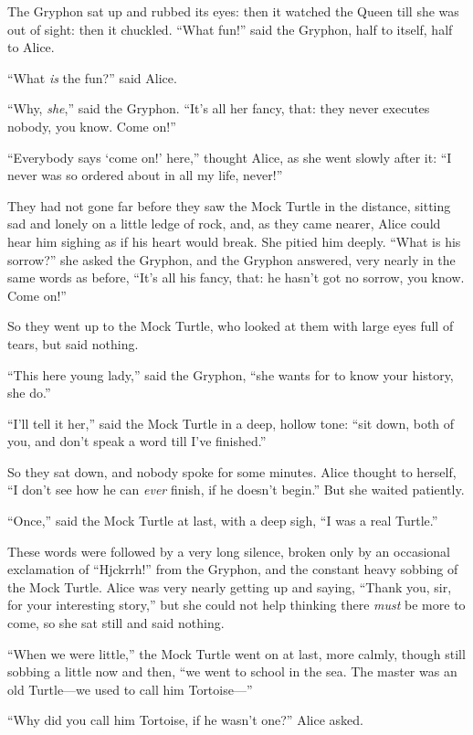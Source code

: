 \documentclass[11pt,openany,oneside]{book}
\begin{document}
The Gryphon sat up and rubbed its eyes: then it watched the Queen till she was out of sight: then it chuckled. “What fun!” said the Gryphon, half to itself, half to Alice. 

“What {\em is\/} the fun?” said Alice. 

“Why, {\em she\/},” said the Gryphon. “It’s all her fancy, that: they never executes nobody, you know. Come on!” 

“Everybody says ‘come on!’ here,” thought Alice, as she went slowly after it: “I never was so ordered about in all my life, never!” 

They had not gone far before they saw the Mock Turtle in the distance, sitting sad and lonely on a little ledge of rock, and, as they came nearer, Alice could hear him sighing as if his heart would break. She pitied him deeply. “What is his sorrow?” she asked the Gryphon, and the Gryphon answered, very nearly in the same words as before, “It’s all his fancy, that: he hasn’t got no sorrow, you know. Come on!” 

So they went up to the Mock Turtle, who looked at them with large eyes full of tears, but said nothing. 

“This here young lady,” said the Gryphon, “she wants for to know your history, she do.” 

“I’ll tell it her,” said the Mock Turtle in a deep, hollow tone: “sit down, both of you, and don’t speak a word till I’ve finished.” 

So they sat down, and nobody spoke for some minutes. Alice thought to herself, “I don’t see how he can {\em ever\/} finish, if he doesn’t begin.” But she waited patiently. 

“Once,” said the Mock Turtle at last, with a deep sigh, “I was a real Turtle.” 

These words were followed by a very long silence, broken only by an occasional exclamation of “Hjckrrh!” from the Gryphon, and the constant heavy sobbing of the Mock Turtle. Alice was very nearly getting up and saying, “Thank you, sir, for your interesting story,” but she could not help thinking there {\em must\/} be more to come, so she sat still and said nothing. 

“When we were little,” the Mock Turtle went on at last, more calmly, though still sobbing a little now and then, “we went to school in the sea. The master was an old Turtle—we used to call him Tortoise—” 

“Why did you call him Tortoise, if he wasn’t one?” Alice asked. 
\end{document}

